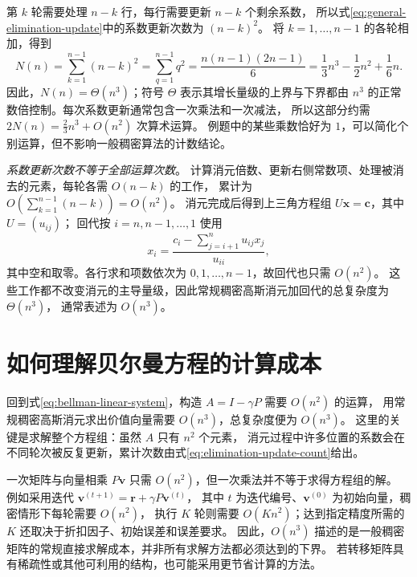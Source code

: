 \documentclass[UTF8,12pt,a4paper,fontset=fandol]{ctexart}
\begin{document}
第 $k$ 轮需要处理 $n-k$ 行，每行需要更新 $n-k$ 个剩余系数，
所以式\eqref{eq:general-elimination-update}中的系数更新次数为 $(n-k)^2$。
将 $k=1,\ldots,n-1$ 的各轮相加，得到
\begin{equation}
  N(n)=\sum_{k=1}^{n-1}(n-k)^2
  =\sum_{q=1}^{n-1}q^2
  =\frac{n(n-1)(2n-1)}6
  =\frac13n^3-\frac12n^2+\frac16n.
  \label{eq:elimination-update-count}
\end{equation}
因此，$N(n)=\Theta(n^3)$；符号 $\Theta$ 表示其增长量级的上界与下界都由
$n^3$ 的正常数倍控制。每次系数更新通常包含一次乘法和一次减法，
所以这部分约需 $2N(n)=\frac23n^3+O(n^2)$ 次算术运算。
例题中的某些乘数恰好为 $1$，可以简化个别运算，但不影响一般稠密算法的计数结论。

\emph{系数更新次数不等于全部运算次数}。
计算消元倍数、更新右侧常数项、处理被消去的元素，每轮各需 $O(n-k)$ 的工作，
累计为 $O(\sum_{k=1}^{n-1}(n-k))=O(n^2)$。
消元完成后得到上三角方程组 $U\boldsymbol x=\boldsymbol c$，其中 $U=(u_{ij})$；
回代按 $i=n,n-1,\ldots,1$ 使用
\[
  x_i=\frac{c_i-\sum_{j=i+1}^{n}u_{ij}x_j}{u_{ii}},
\]
其中空和取零。各行求和项数依次为 $0,1,\ldots,n-1$，故回代也只需 $O(n^2)$。
这些工作都不改变消元的主导量级，因此常规稠密高斯消元加回代的总复杂度为 $\Theta(n^3)$，
通常表述为 $O(n^3)$。

\section{如何理解贝尔曼方程的计算成本}

回到式\eqref{eq:bellman-linear-system}，构造 $A=I-\gamma P$ 需要 $O(n^2)$ 的运算，
用常规稠密高斯消元求出价值向量需要 $O(n^3)$，总复杂度便为 $O(n^3)$。
这里的关键是求解整个方程组：虽然 $A$ 只有 $n^2$ 个元素，
消元过程中许多位置的系数会在不同轮次被反复更新，累计次数由式\eqref{eq:elimination-update-count}给出。

一次矩阵与向量相乘 $P\boldsymbol v$ 只需 $O(n^2)$，但一次乘法并不等于求得方程组的解。
例如采用迭代 $\boldsymbol v^{(t+1)}=\boldsymbol r+\gamma P\boldsymbol v^{(t)}$，
其中 $t$ 为迭代编号、$\boldsymbol v^{(0)}$ 为初始向量，稠密情形下每轮需要 $O(n^2)$，
执行 $K$ 轮则需要 $O(Kn^2)$；达到指定精度所需的 $K$ 还取决于折扣因子、初始误差和误差要求。
因此，$O(n^3)$ 描述的是一般稠密矩阵的常规直接求解成本，并非所有求解方法都必须达到的下界。
若转移矩阵具有稀疏性或其他可利用的结构，也可能采用更节省计算的方法。
\end{document}
